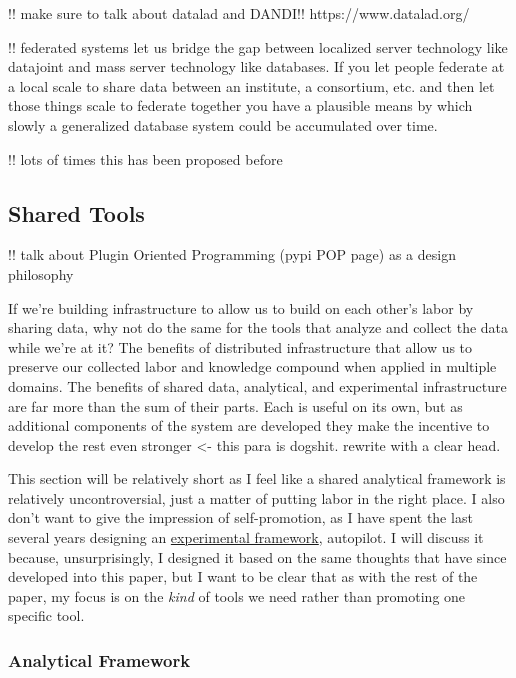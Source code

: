 \documentclass{article}
\begin{document}
!! make sure to talk about datalad and DANDI!! https://www.datalad.org/

!! federated systems let us bridge the gap between localized server
technology like datajoint and mass server technology like databases. If
you let people federate at a local scale to share data between an
institute, a consortium, etc. and then let those things scale to
federate together you have a plausible means by which slowly a
generalized database system could be accumulated over time.

!! lots of times this has been proposed before \cite{
simaEnablingSemanticQueries2019,
djokic-petrovicPIBASFedSPARQLWebbased2017,
hasnainBioFedFederatedQuery2017}

\hypertarget{shared-tools}{%
\subsection{Shared Tools}\label{shared-tools}}
 
!! talk about Plugin Oriented Programming (pypi POP page) as a design
philosophy

If we're building infrastructure to allow us to build on each other's
labor by sharing data, why not do the same for the tools that analyze
and collect the data while we're at it? The benefits of distributed
infrastructure that allow us to preserve our collected labor and
knowledge compound when applied in multiple domains. The benefits of
shared data, analytical, and experimental infrastructure are far more
than the sum of their parts. Each is useful on its own, but as
additional components of the system are developed they make the
incentive to develop the rest even stronger \textless- this para is
dogshit. rewrite with a clear head.

This section will be relatively short as I feel like a shared analytical
framework is relatively uncontroversial, just a matter of putting labor
in the right place. I also don't want to give the impression of
self-promotion, as I have spent the last several years designing an
\href{https://docs.auto-pi-lot.com}{experimental framework}, autopilot.
I will discuss it because, unsurprisingly, I designed it based on the
same thoughts that have since developed into this paper, but I want to
be clear that as with the rest of the paper, my focus is on the
\emph{kind} of tools we need rather than promoting one specific tool.

\hypertarget{analytical-framework}{%
\subsubsection{Analytical Framework}\label{analytical-framework}}
\end{document}
